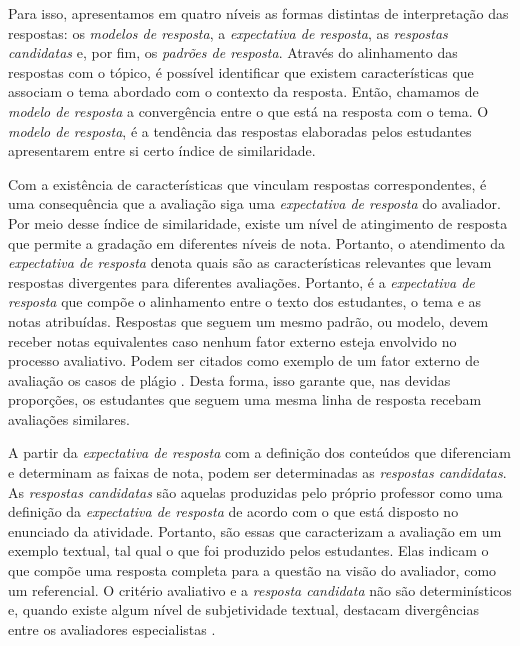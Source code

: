 Para isso, apresentamos em quatro níveis as formas distintas de interpretação das respostas: os \textit{modelos de resposta}, a \textit{expectativa de resposta}, as \textit{respostas candidatas} e, por fim, os \textit{padrões de resposta}. Através do alinhamento das respostas com o tópico, é possível identificar que existem características que associam o tema abordado com o contexto da resposta. Então, chamamos de \textit{modelo de resposta} a convergência entre o que está na resposta com o tema. O \textit{modelo de resposta}, é a tendência das respostas elaboradas pelos estudantes apresentarem entre si certo índice de similaridade.

Com a existência de características que vinculam respostas correspondentes, é uma consequência que a avaliação siga uma \textit{expectativa de resposta} do avaliador. Por meio desse índice de similaridade, existe um nível de atingimento de resposta que permite a gradação em diferentes níveis de nota. Portanto, o atendimento da \textit{expectativa de resposta} denota quais são as características relevantes que levam respostas divergentes para  diferentes avaliações. Portanto, é a \textit{expectativa de resposta} que compõe o alinhamento entre o texto dos estudantes, o tema e as notas atribuídas. Respostas que seguem um mesmo padrão, ou modelo, devem receber notas equivalentes caso nenhum fator externo esteja envolvido no processo avaliativo. Podem ser citados como exemplo de um fator externo de avaliação os casos de plágio \cite{campana-filho2017}. Desta forma, isso garante que, nas devidas proporções, os estudantes que seguem uma mesma linha de resposta recebam avaliações similares.

A partir da \textit{expectativa de resposta} com a definição dos conteúdos que diferenciam e determinam as faixas de nota, podem ser determinadas as \textit{respostas candidatas}. As \textit{respostas candidatas} são aquelas produzidas pelo próprio professor como uma definição da \textit{expectativa de resposta} de acordo com o que está disposto no enunciado da atividade. Portanto, são essas que caracterizam a avaliação em um exemplo textual, tal qual o que foi produzido pelos estudantes. Elas indicam o que compõe uma resposta completa para a questão na visão do avaliador, como um referencial. O critério avaliativo e a \textit{resposta candidata} não são determinísticos e, quando existe algum nível de subjetividade textual, destacam divergências entre os avaliadores especialistas \cite{pado2021}.

